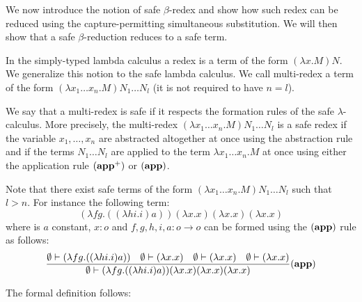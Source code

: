 We now introduce the notion of safe $\beta$-redex and show how such redex can be reduced using the
capture-permitting simultaneous substitution. We will then show that
a safe $\beta$-reduction reduces to a safe term.


In the simply-typed lambda calculus a redex is a term of the form $(\lambda x . M) N$.
We generalize this notion to the safe lambda calculus. We call multi-redex a term of the form
$(\lambda x_1 \ldots x_n . M) N_1 \ldots N_l$ (it is not required to have $n=l$).


We say that a multi-redex is safe if it respects the formation rules of the safe $\lambda$-calculus. More precisely,
the multi-redex $(\lambda x_1 \ldots x_n . M) N_1 \ldots N_l$ is a safe redex if the variable $x_1,\ldots,x_n$
are abstracted altogether at once using the abstraction rule and if the terms $N_1 \ldots N_l$ are applied to the
term $\lambda x_1 \ldots x_n . M$ at once using either the application rule $\mathbf{(app^+)}$ or $\mathbf{(app)}$.

Note that there exist safe terms of the form $(\lambda x_1 \ldots x_n . M) N_1 \ldots N_l$
such that $l>n$. For instance the following term:
$$ (\lambda f g . ((\lambda h i . i) a) ) (\lambda x.x) (\lambda x.x) (\lambda x.x)$$
where is $a$ constant, $x : o$ and $f,g,h,i,a:o \rightarrow o$ can be formed using the $\mathbf{(app)}$ rule as follows:
$$ \frac{\displaystyle 
    \emptyset \vdash (\lambda f g . ((\lambda h i . i) a) )
        \quad \emptyset \vdash (\lambda x.x)
        \quad \emptyset \vdash (\lambda x.x)
        \quad \emptyset \vdash (\lambda x.x)
    }{
       \emptyset \vdash (\lambda f g . ((\lambda h i . i) a) ) (\lambda x.x) (\lambda x.x) (\lambda x.x)
    } \mathbf{(app)}
$$


The formal definition follows:

